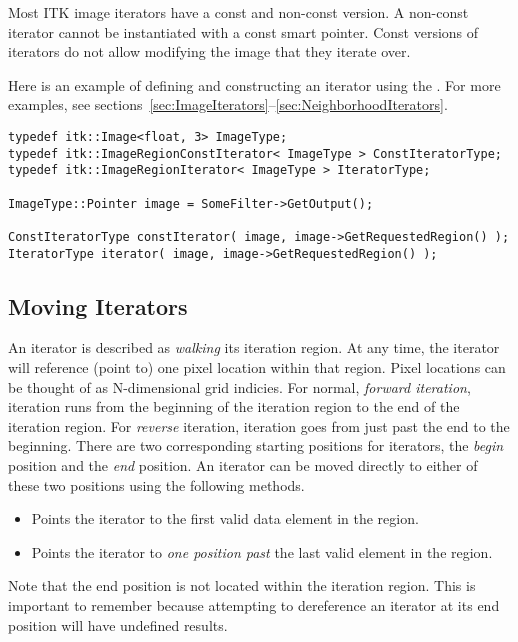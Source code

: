 Most ITK image iterators have a const and non-const version.  A non-const
iterator cannot be instantiated with a const  smart pointer.
Const versions of iterators do not allow modifying the image that they iterate
over.

Here is an example of defining and constructing an iterator using the
.  For more examples, see
sections~\ref{sec:ImageIterators}--\ref{sec:NeighborhoodIterators}.

\begin{verbatim}
typedef itk::Image<float, 3> ImageType;
typedef itk::ImageRegionConstIterator< ImageType > ConstIteratorType;
typedef itk::ImageRegionIterator< ImageType > IteratorType;

ImageType::Pointer image = SomeFilter->GetOutput();

ConstIteratorType constIterator( image, image->GetRequestedRegion() );
IteratorType iterator( image, image->GetRequestedRegion() );
\end{verbatim}


\subsection{Moving Iterators}
\label{sec:MovingIterators}
An iterator is described as \emph{walking} its iteration region.  At any time,
the iterator will reference (point to) one pixel location within that region.
Pixel locations can be thought of as N-dimensional grid indicies.  For normal,
\emph{forward iteration}, iteration runs from the beginning of the iteration
region to the end of the iteration region.  For \emph{reverse} iteration,
iteration goes from just past the end to the beginning.  There are two
corresponding starting positions for iterators, the \emph{begin} position and
the \emph{end} position.  An iterator can be moved directly to either of these
two positions using the following methods.

\begin{itemize}
\item \textbf{} Points the iterator to the first valid
data element in the region.

\item \textbf{} Points the iterator to \emph{one position past}
the last valid element in the region.
\end{itemize}

Note that the end position is not located within the iteration region.  This is
important to remember because attempting to dereference an iterator at its end
position will have undefined results.

